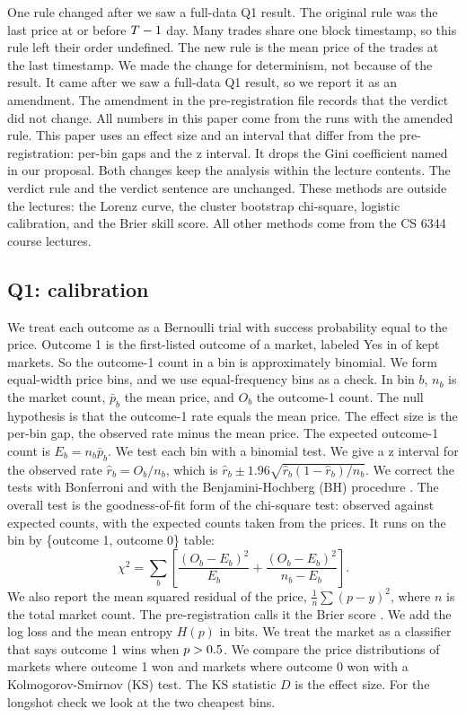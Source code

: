 One rule changed after we saw a full-data Q1 result.
The original rule was the last price at or before $T-1$ day.
Many trades share one block timestamp, so this rule left their order undefined.
The new rule is the mean price of the trades at the last timestamp.
We made the change for determinism, not because of the result.
It came after we saw a full-data Q1 result, so we report it as an amendment.
The amendment in the pre-registration file records that the verdict did not change.
All numbers in this paper come from the runs with the amended rule.
This paper uses an effect size and an interval that differ from the pre-registration: per-bin gaps and the z interval.
It drops the Gini coefficient named in our proposal.
Both changes keep the analysis within the lecture contents.
The verdict rule and the verdict sentence are unchanged.
These methods are outside the lectures: the Lorenz curve, the cluster bootstrap chi-square, logistic calibration, and the Brier skill score.
All other methods come from the CS 6344 course lectures.

\subsection{Q1: calibration}\label{sec:methods-q1}
We treat each outcome as a Bernoulli trial with success probability equal to the price.
Outcome 1 is the first-listed outcome of a market, labeled Yes in \OutcomeOneYesShare{} of kept markets.
So the outcome-1 count in a bin is approximately binomial.
We form \NBins{} equal-width price bins, and we use equal-frequency bins as a check.
In bin $b$, $n_b$ is the market count, $\bar p_b$ the mean price, and $O_b$ the outcome-1 count.
The null hypothesis is that the outcome-1 rate equals the mean price.
The effect size is the per-bin gap, the observed rate minus the mean price.
The expected outcome-1 count is $E_b=n_b\bar p_b$.
We test each bin with a binomial test.
We give a \CiLevel{} z interval for the observed rate $\hat r_b=O_b/n_b$, which is $\hat r_b\pm1.96\sqrt{\hat r_b(1-\hat r_b)/n_b}$.
We correct the \NBins{} tests with Bonferroni and with the Benjamini-Hochberg (BH) procedure \citep{benjamini1995controlling}.
The overall test is the goodness-of-fit form of the chi-square test: observed against expected counts, with the expected counts taken from the prices.
It runs on the bin by \{outcome 1, outcome 0\} table:
\begin{equation}
\chi^2=\sum_{b}\left[\frac{(O_b-E_b)^2}{E_b}+\frac{(O_b-E_b)^2}{n_b-E_b}\right].
\label{eq:chisq}
\end{equation}
We also report the mean squared residual of the price, $\frac1n\sum(p-y)^2$, where $n$ is the total market count.
The pre-registration calls it the Brier score \citep{brier1950verification}.
We add the log loss and the mean entropy $H(p)$ in bits.
We treat the market as a classifier that says outcome 1 wins when $p>0.5$.
We compare the price distributions of markets where outcome 1 won and markets where outcome 0 won with a Kolmogorov-Smirnov (KS) test.
The KS statistic $D$ is the effect size.
For the longshot check we look at the two cheapest bins.

